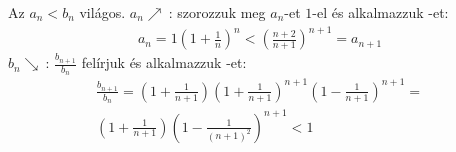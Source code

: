    Az $a_{n}<b_{n}$ világos. 
   \newline
   $a_{n}\nearrow\ $: szorozzuk meg $a_{n}$-et $1$-el és 
   alkalmazzuk -et:
   \begin{align*}
   a_{n} = 1{\left( 1+\frac{1}{n}\right)}^{n}< 
   {\left( \frac{n+2}{n+1} \right) }^{n+1} = a_{n+1}
   \end{align*}
   $b_{n}\searrow\ $: $\frac{b_{n+1}}{b_{n}}$ felírjuk és alkalmazzuk 
   -et:
   \begin{gather*}
   \frac{b_{n+1}}{b_{n}} = 
   {\left( 1+\frac{1}{n+1}\right)}
   {\left( 1+\frac{1}{n+1}\right)}^{n+1}
   {\left( 1-\frac{1}{n+1}\right)}^{n+1}=\\
   {\left( 1+\frac{1}{n+1}\right)}{\left( 1-\frac{1}{(n+1)^2}\right)}^{n+1} < 1
   \end{gather*}
